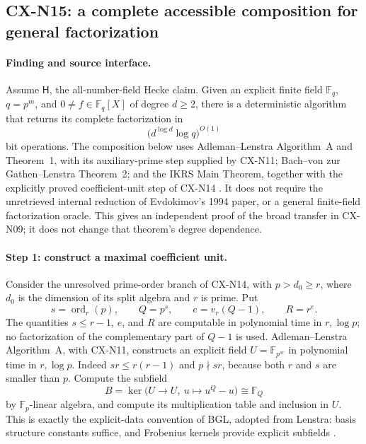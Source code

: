 \subsection{CX-N15: a complete accessible composition for general factorization}
\label{finding:CX-N15}

\paragraph{Finding and source interface.}
Assume \(\mathsf H\), the all-number-field Hecke claim.
Given an explicit finite field \(\mathbb F_q\), \(q=p^m\), and
\(0\ne f\in\mathbb F_q[X]\) of degree \(d\geq2\), there is a
deterministic algorithm that returns its complete factorization in
\[
 \bigl(d^{\log d}\log q\bigr)^{O(1)}
\]
bit operations.
The composition below uses Adleman--Lenstra Algorithm~A and
Theorem~1, with its auxiliary-prime step supplied by CX-N11;
Bach--von zur Gathen--Lenstra Theorem~2; and the IKRS Main Theorem,
together with the explicitly proved coefficient-unit step of
CX-N14
\cite{CXNAdlemanLenstra86,CXNBGL01,CXNIKRS08}.
It does not require the unretrieved internal reduction of
Evdokimov's 1994 paper, or a general finite-field factorization
oracle.
This gives an independent proof of the broad transfer in CX-N09;
it does not change that theorem's degree dependence.

\paragraph{Step 1: construct a maximal coefficient unit.}
Consider the unresolved prime-order branch of CX-N14, with
\(p>d_0\geq r\), where \(d_0\) is the dimension of its split
algebra and \(r\) is prime. Put
\[
 s=\operatorname{ord}_r(p),\qquad Q=p^s,
 \qquad e=v_r(Q-1),\qquad R=r^e.
\]
The quantities \(s\leq r-1\), \(e\), and \(R\) are computable
in polynomial time in \(r,\log p\); no factorization of the
complementary part of \(Q-1\) is used.
Adleman--Lenstra Algorithm~A, with CX-N11, constructs an explicit
field
\(U=\mathbb F_{p^{sr}}\) in polynomial time in \(r,\log p\).
Indeed \(sr\leq r(r-1)\) and \(p\nmid sr\), because both
\(r\) and \(s\) are smaller than \(p\).
Compute the subfield
\[
 B=\ker\bigl(U\longrightarrow U,\ u\longmapsto u^Q-u\bigr)
   \cong\mathbb F_Q
\]
by \(\mathbb F_p\)-linear algebra, and compute its multiplication
table and inclusion in \(U\).
This is exactly the explicit-data convention of BGL, adopted
from Lenstra: basis structure constants suffice, and Frobenius
kernels provide explicit subfields
\cite[p.~329 and \S2, p.~332]{CXNLenstra91}.


